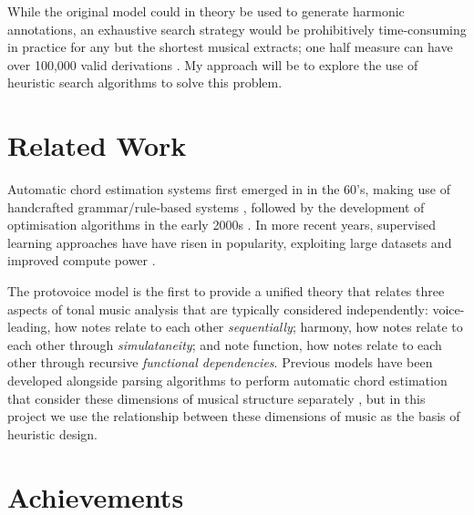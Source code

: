 \documentclass[12pt,a4paper,twoside,openright]{report}
\theoremstyle{definition}
\begin{document}
While the original model could in theory be used to generate harmonic annotations, an exhaustive search strategy would be prohibitively time-consuming in practice for any but the shortest musical extracts; one half measure can have over 100,000 valid derivations \cite{finkensiepStructureFreePolyphony2023}. My approach will be to explore the use of heuristic search algorithms to solve this problem.

\section{Related Work}

Automatic chord estimation systems first emerged in in the 60's, making use of handcrafted grammar/rule-based systems \cite{maxwellExpertSystemHarmonizing1992} \cite{winogradLinguisticsComputerAnalysis1968}, followed by the development of optimisation algorithms in the early 2000s \cite{pardoAlgorithmsChordalAnalysis2002}. In more recent years, supervised learning approaches have have risen in popularity, exploiting large datasets and improved compute power \cite{niEndtoendMachineLearning2011} \cite{mcleodModularSystemHarmonic2021} \cite{masadaChordRecognitionSymbolic2018}. 
\par 
The protovoice model is the first to provide a unified theory that relates three aspects of tonal music analysis that are typically considered independently: voice-leading, how notes relate to each other \textit{sequentially}; harmony, how notes relate to each other through \textit{simulataneity}; and note function, how notes relate to each other through recursive \textit{functional dependencies}. Previous models have been developed alongside parsing algorithms to perform automatic chord estimation that consider these dimensions of musical structure separately \cite{maxwellExpertSystemHarmonizing1992} \cite{winogradLinguisticsComputerAnalysis1968}, but in this project we use the relationship between these dimensions of music as the basis of heuristic design.
\par

\section{Achievements}
\end{document}
